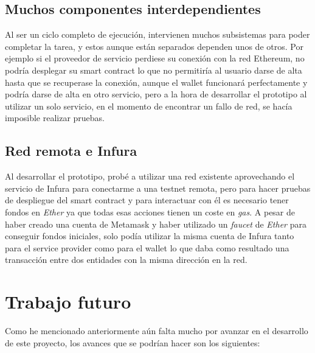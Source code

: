 \documentclass[12pt]{report}
\begin{document}
\subsection{Muchos componentes interdependientes}
Al ser un ciclo completo de ejecución, intervienen muchos subsistemas para poder completar la tarea, y estos aunque están separados dependen unos de otros. Por ejemplo si el proveedor de servicio perdiese su conexión con la red Ethereum, no podría desplegar su smart contract lo que no permitiría al usuario darse de alta hasta que se recuperase la conexión, aunque el wallet funcionará perfectamente y podría darse de alta en otro servicio, pero a la hora de desarrollar el prototipo al utilizar un solo servicio, en el momento de encontrar un fallo de red, se hacía imposible realizar pruebas.

\subsection{Red remota e Infura}
Al desarrollar el prototipo, probé a utilizar una red existente aprovechando el servicio de Infura para conectarme a una testnet remota, pero para hacer pruebas de despliegue del smart contract y para interactuar con él es necesario tener fondos en \textit{Ether} ya que todas esas acciones tienen un coste en \textit{gas}. A pesar de haber creado una cuenta de Metamask y haber utilizado un \textit{faucet} de \textit{Ether} para conseguir fondos iniciales, solo podía utilizar la misma cuenta de Infura tanto para el service provider como para el wallet lo que daba como resultado una transacción entre dos entidades con la misma dirección en la red.

\section{Trabajo futuro}
Como he mencionado anteriormente aún falta mucho por avanzar en el desarrollo de este proyecto, los avances que se podrían hacer son los siguientes:
\end{document}
